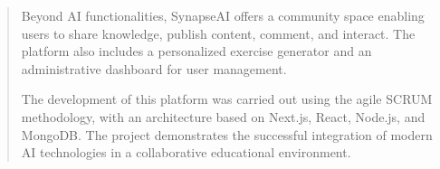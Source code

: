\begin{abstract}
Beyond AI functionalities, SynapseAI offers a community space enabling users to share knowledge, publish content, comment, and interact. The platform also includes a personalized exercise generator and an administrative dashboard for user management.

The development of this platform was carried out using the agile SCRUM methodology, with an architecture based on Next.js, React, Node.js, and MongoDB. The project demonstrates the successful integration of modern AI technologies in a collaborative educational environment.

\vspace{0.5cm}


\end{abstract}
